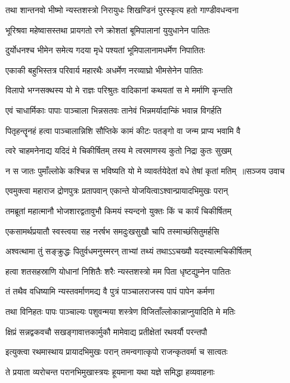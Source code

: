 \twolineshloka
{तथा शान्तनवो भीष्मो न्यस्तशस्त्रो निरायुधः}
{शिखण्डिनं पुरस्कृत्य हतो गाण्डीवधन्वना}


\twolineshloka
{भूरिश्रवा महेष्वासस्तथा प्रायगतो रणे}
{क्रोशतां बूमिपालानां युयुधानेन पातितः}


\twolineshloka
{दुर्योधनश्च भीमेन समेत्य गदया मृधे}
{पश्यतां भूमिपालानामधर्मेण निपातितः}


\twolineshloka
{एकाकी बहुभिस्तत्र परिवार्य महारथैः}
{अधर्मेण नरव्याघ्रो भीमसेनेन पातितः}


\twolineshloka
{विलापो भग्नसक्थस्य यो मे राज्ञः परिश्रुतः}
{वादिकानां कथयतां स मे मर्माणि कृन्तति}


\twolineshloka
{एवं चाधार्मिकाः पापाः पाञ्चाला भिन्नसतवः}
{तानेवं भिन्नमर्यादान्किं भवान्न विगर्हति}


\twolineshloka
{पितृहन्तॄनहं हत्वा पाञ्चालान्निशि सौप्तिके}
{कामं कीटः पतङ्गो वा जन्म प्राप्य भवामि वै}


\twolineshloka
{त्वरे चाहमनेनाद्य यदिदं मे चिकीर्षितम्}
{तस्य मे त्वरमाणस्य कुतो निद्रा कुतः सुखम्}


\threelineshloka
{न स जातः पुमाँल्लोके कश्चिन्न स भविष्यति}
{यो मे व्यावर्तयेदेतां वधे तेषां कृतां मतिम् ॥सञ्जय उवाच}
{}


\twolineshloka
{एवमुक्त्वा महाराज द्रोणपुत्रः प्रतापवान्}
{एकान्ते योजयित्वाऽश्वान्प्रायादभिमुखः परान्}


\twolineshloka
{तमब्रूतां महात्मानौ भोजशारद्वतावुभौ}
{किमयं स्यन्दनो युक्तः किं च कार्यं चिकीर्षितम्}


\twolineshloka
{एकसामर्थप्रयातौ स्वस्त्वया सह नरर्षभ}
{समदुःखसुखौ चापि तस्माच्छंसितुमर्हसि}


\twolineshloka
{अश्वत्थामा तुं सङ्क्रुद्धः पितुर्वधमनुस्मरन्}
{ताभ्यां तथ्यं तथाऽऽचख्यौ यदस्यात्मचिकीर्षितम्}


\twolineshloka
{हत्वा शतसहस्राणि योधानां निशितैः शरैः}
{न्यस्तशस्त्रो मम पिता धृष्टद्युम्नेन पातितः}


\twolineshloka
{तं तथैव वधिष्यामि न्यस्तवर्माणमद्य वै}
{पुत्रं पाञ्चालराजस्य पापं पापेन कर्मणा}


\twolineshloka
{तथा विनिहतः पापः पाञ्चाल्यः पशुवन्मया}
{शस्त्रेण विजिताँल्लोकान्नाप्नुयादिति मे मतिः}


\twolineshloka
{क्षिप्रं सन्नद्वकवचौ सखङ्गावात्तकार्मुकौ}
{मामेवाद्य प्रतीक्षेतां रथवर्यौ परन्तपौ}


\twolineshloka
{इत्युक्त्वा रथमास्थाय प्रायादभिमुखः परान्}
{तमन्वगात्कृपो राजन्कृतवर्मा च सात्वतः}


\twolineshloka
{ते प्रयाता व्यरोचन्त परानभिमुखास्त्रयः}
{हूयमाना यथा यज्ञे समिद्धा हव्यवाहनाः}


